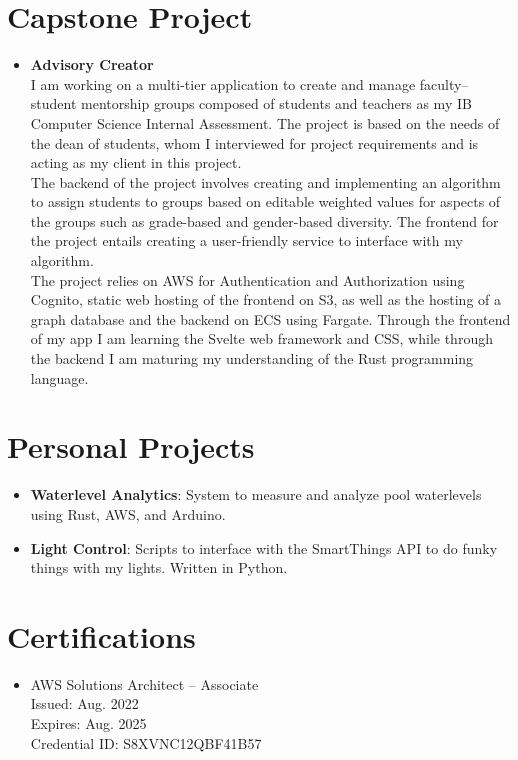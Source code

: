 \documentclass[letterpaper,11pt]{article}
\newcommand{\resumeItem}[2]{
    \item\small{
        \textbf{#1}{: #2 \vspace{-3pt}}
    }
}
\newcommand{\resumeSubItem}[2]{\resumeItem{#1}{#2}\vspace{-4pt}}
\newcommand{\resumeSubHeadingListStart}{\begin{itemize}[leftmargin=*]}
\newcommand{\resumeSubHeadingListEnd}{\end{itemize}}
\begin{document}
\section{Capstone Project}
    \resumeSubHeadingListStart
    \item[]{
    \textbf{Advisory Creator}\\
    I am working on a multi-tier application to create and manage faculty--student mentorship groups composed of students and teachers as my IB Computer Science Internal Assessment.
    The project is based on the needs of the dean of students, whom I interviewed for project requirements and is acting as my client in this project.\\
    \vspace{0.15cm}
    The backend of the project involves creating and implementing an algorithm to assign students to groups based on editable weighted values for aspects of the groups such as grade-based and gender-based diversity.
    The frontend for the project entails creating a user-friendly service to interface with my algorithm.\\
    \vspace{0.15cm}
    The project relies on AWS for Authentication and Authorization using Cognito, static web hosting of the frontend on S3, as well as the hosting of a graph database and the backend on ECS using Fargate.
    Through the frontend of my app I am learning the Svelte web framework and CSS, while through the backend I am maturing my understanding of the Rust programming language.\\
    }
    \resumeSubHeadingListEnd

\section{Personal Projects}
    \resumeSubHeadingListStart
        \resumeSubItem{Waterlevel Analytics}
            {System to measure and analyze pool waterlevels using Rust, AWS, and Arduino.}
        \resumeSubItem{Light Control}
            {Scripts to interface with the SmartThings API to do funky things with my lights. Written in Python.}
    \resumeSubHeadingListEnd


    \section{Certifications}
    \resumeSubHeadingListStart
        \item{
            AWS Solutions Architect -- Associate\\
            \hspace{.3cm}\small Issued: Aug. 2022\\
            \hspace{.3cm}\small Expires: Aug. 2025\\
            \hspace{.3cm}\small Credential ID: S8XVNC12QBF41B57\\
        }
    \resumeSubHeadingListEnd
\end{document}
